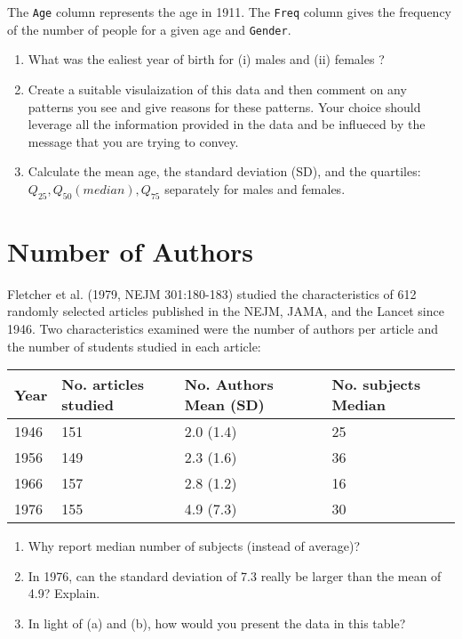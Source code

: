 \documentclass[letterpaper,9pt,twoside,printwatermark=false]{pinp}
\providecommand{\tightlist}{%
  \setlength{\itemsep}{0pt}\setlength{\parskip}{0pt}}
\begin{document}
The \texttt{Age} column represents the age in 1911. The \texttt{Freq}
column gives the frequency of the number of people for a given age and
\texttt{Gender}.

\begin{enumerate}
\def\labelenumi{\alph{enumi})}
\tightlist
\item
  What was the ealiest year of birth for (i) males and (ii) females ?
\item
  Create a suitable visulaization of this data and then comment on any
  patterns you see and give reasons for these patterns. Your choice
  should leverage all the information provided in the data and be
  influeced by the message that you are trying to convey.
\item
  Calculate the mean age, the standard deviation (SD), and the
  quartiles: \(Q_{25}, Q_{50} (median), Q_{75}\) separately for males
  and females.
\end{enumerate}

\section{Number of Authors}\label{number-of-authors}

Fletcher et al. (1979, NEJM 301:180-183) studied the characteristics of
612 randomly selected articles published in the NEJM, JAMA, and the
Lancet since 1946. Two characteristics examined were the number of
authors per article and the number of students studied in each article:

\begin{longtable}[]{@{}llll@{}}
\toprule
Year & No. articles studied & No. Authors Mean (SD) & No. subjects
Median\tabularnewline
\midrule
\endhead
1946 & 151 & 2.0 (1.4) & 25\tabularnewline
1956 & 149 & 2.3 (1.6) & 36\tabularnewline
1966 & 157 & 2.8 (1.2) & 16\tabularnewline
1976 & 155 & 4.9 (7.3) & 30\tabularnewline
\bottomrule
\end{longtable}

\begin{enumerate}
\def\labelenumi{\alph{enumi})}
\tightlist
\item
  Why report median number of subjects (instead of average)?
\item
  In 1976, can the standard deviation of 7.3 really be larger than the
  mean of 4.9? Explain.
\item
  In light of (a) and (b), how would you present the data in this table?
\end{enumerate}
\end{document}
